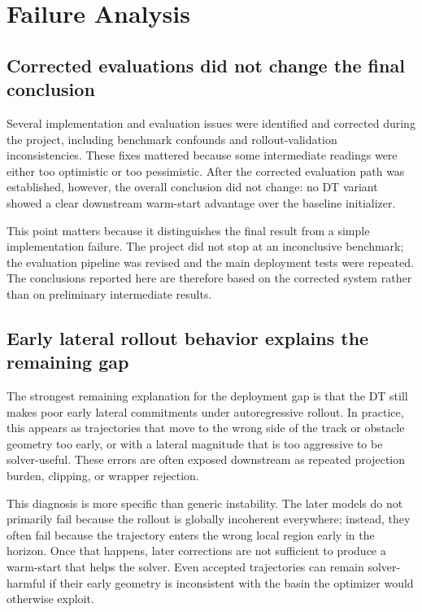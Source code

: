 \section{Failure Analysis}
\label{sec:failure_analysis}

\subsection{Corrected evaluations did not change the final conclusion}

Several implementation and evaluation issues were identified and corrected during the project, including benchmark confounds and rollout-validation inconsistencies. These fixes mattered because some intermediate readings were either too optimistic or too pessimistic. After the corrected evaluation path was established, however, the overall conclusion did not change: no DT variant showed a clear downstream warm-start advantage over the baseline initializer.

This point matters because it distinguishes the final result from a simple implementation failure. The project did not stop at an inconclusive benchmark; the evaluation pipeline was revised and the main deployment tests were repeated. The conclusions reported here are therefore based on the corrected system rather than on preliminary intermediate results.

\subsection{Early lateral rollout behavior explains the remaining gap}

The strongest remaining explanation for the deployment gap is that the DT still makes poor early lateral commitments under autoregressive rollout. In practice, this appears as trajectories that move to the wrong side of the track or obstacle geometry too early, or with a lateral magnitude that is too aggressive to be solver-useful. These errors are often exposed downstream as repeated projection burden, clipping, or wrapper rejection.

This diagnosis is more specific than generic instability. The later models do not primarily fail because the rollout is globally incoherent everywhere; instead, they often fail because the trajectory enters the wrong local region early in the horizon. Once that happens, later corrections are not sufficient to produce a warm-start that helps the solver. Even accepted trajectories can remain solver-harmful if their early geometry is inconsistent with the basin the optimizer would otherwise exploit.

